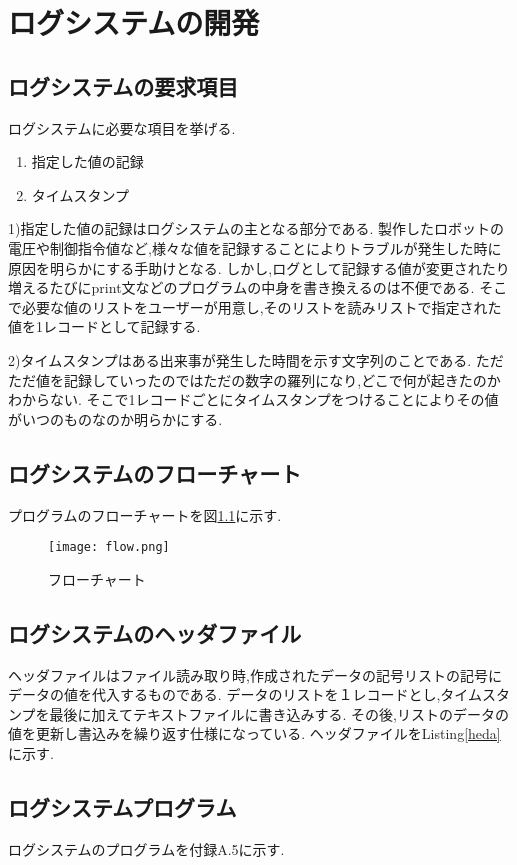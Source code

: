 \documentclass[12pt,oneside]{paper}
\begin{document}
\chapter{ログシステムの開発}
\section{ログシステムの要求項目}
ログシステムに必要な項目を挙げる.
\begin{enumerate}
 \item 指定した値の記録
 \item タイムスタンプ
\end{enumerate}
1)指定した値の記録はログシステムの主となる部分である.
製作したロボットの電圧や制御指令値など,様々な値を記録することによりトラブルが発生した時に原因を明らかにする手助けとなる.
しかし,ログとして記録する値が変更されたり増えるたびにprint文などのプログラムの中身を書き換えるのは不便である.
そこで必要な値のリストをユーザーが用意し,そのリストを読みリストで指定された値を1レコードとして記録する.


2)タイムスタンプはある出来事が発生した時間を示す文字列のことである.
ただただ値を記録していったのではただの数字の羅列になり,どこで何が起きたのかわからない.
そこで1レコードごとにタイムスタンプをつけることによりその値がいつのものなのか明らかにする.

\section{ログシステムのフローチャート}
プログラムのフローチャートを図\ref{fig:flow}に示す.
\begin{figure}[H]
 \begin{center}
  \texttt{[image: flow.png]}
 \end{center}
 \caption{フローチャート}
 \label{fig:flow}
\end{figure}

\section{ログシステムのヘッダファイル}
ヘッダファイルはファイル読み取り時,作成されたデータの記号リストの記号にデータの値を代入するものである.
データのリストを１レコードとし,タイムスタンプを最後に加えてテキストファイルに書き込みする.
その後,リストのデータの値を更新し書込みを繰り返す仕様になっている.
ヘッダファイルをListing\ref{heda}に示す.

\section{ログシステムプログラム}
ログシステムのプログラムを付録A.5に示す.
\end{document}
